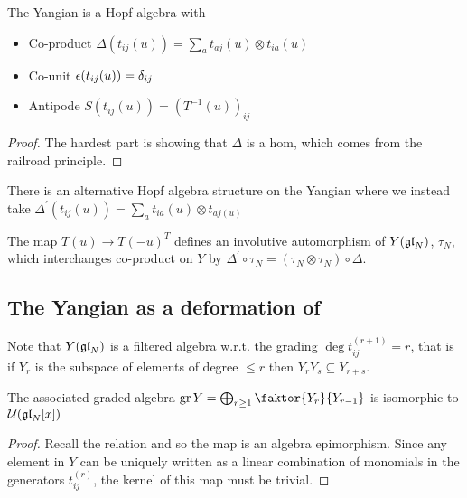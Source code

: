 \documentclass{article}
\begin{document}
\begin{theorem}
The Yangian is a Hopf algebra with 
\begin{itemize}
    \item Co-product $\Delta (t_{ij}(u)) = \sum_a t_{aj}(u) \otimes t_{ia}(u)$
    \item Co-unit $\epsilon(t_{ij}(u)) = \delta_{ij}$
    \item Antipode $S(t_{ij}(u)) = (T^{-1}(u))_{ij}$
\end{itemize}
\end{theorem}
\begin{proof}
The hardest part is showing that $\Delta$ is a hom, which comes from the railroad principle. 
\end{proof}

\begin{remark}
There is an alternative Hopf algebra structure on the Yangian where we instead take $\Delta^\prime(t_{ij}(u)) = \sum_a t_{ia}(u) \otimes t_{aj(u)}$
\end{remark}

\begin{prop}
The map $T(u) \to T(-u)^T $ defines an involutive automorphism of $Y(\mathfrak{gl}_N)$, $\tau_N$, which interchanges co-product on $Y$ by $\Delta^\prime \circ \tau_N = (\tau_N \otimes \tau_N) \circ \Delta$. 
\end{prop}

\subsection{The Yangian as a deformation of }

Note that $Y(\mathfrak{gl}_N)$ is a filtered algebra w.r.t. the grading $\deg t_{ij}^{(r+1)} = r$, that is if $Y_r$ is the subspace of elements of degree $\leq r$ then $Y_r Y_s \subseteq Y_{r+s}$. 

\begin{prop}
The associated graded algebra $\gr Y = \bigoplus_{r \geq 1} \faktor{Y_r}{Y_{r-1}}$ is isomorphic to $\mathcal{U}(\mathfrak{gl}_N[x])$
\end{prop}
\begin{proof}
Recall the relation 
and so the map 
is an algebra epimorphism. Since any element in $Y$ can be uniquely written as a linear combination of monomials in the generators $t_{ij}^{(r)}$, the kernel of this map must be trivial. 
\end{proof}
\end{document}
